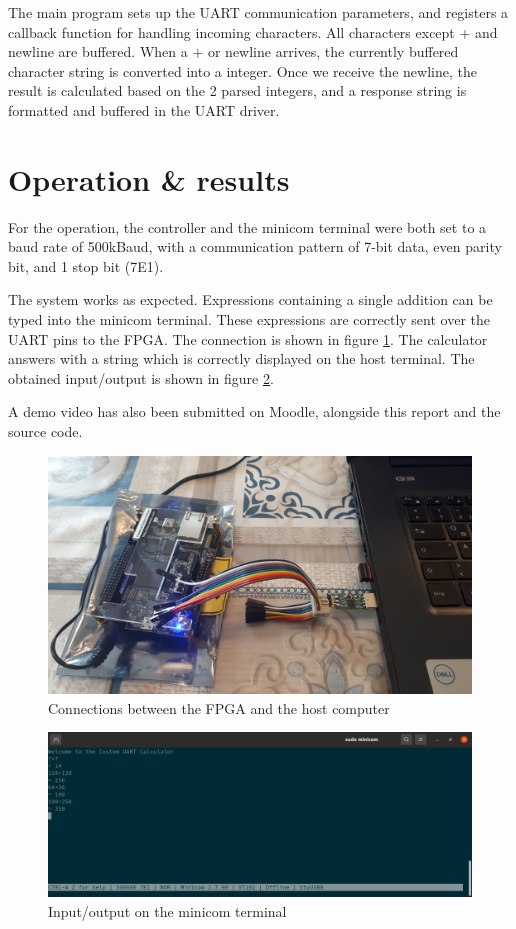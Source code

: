 \documentclass[12pt,a4paper]{article}
\begin{document}
The main program sets up the UART communication parameters, and registers a callback function for handling incoming characters. All characters except + and newline are buffered. When a + or newline arrives, the currently buffered character string is converted into a integer. Once we receive the newline, the result is calculated based on the 2 parsed integers, and a response string is formatted and buffered in the UART driver.


\section{Operation \& results}

For the operation, the controller and the minicom terminal were both set to a baud rate of 500kBaud, with a communication pattern of 7-bit data, even parity bit, and 1 stop bit (7E1).

The system works as expected. Expressions containing a single addition can be typed into the minicom terminal. These expressions are correctly sent over the UART pins to the FPGA. The connection is shown in figure \ref{fig:connection}. The calculator answers with a string which is correctly displayed on the host terminal. The obtained input/output is shown in figure \ref{fig:io}.

A demo video has also been submitted on Moodle, alongside this report and the source code.

\begin{figure}[p]
	\centering
	\includegraphics[width=\textwidth]{connections}
	\caption{Connections between the FPGA and the host computer}
	\label{fig:connection}
\end{figure}

\begin{figure}[p]
	\centering
	\includegraphics[width=\textwidth]{io_crop}
	\caption{Input/output on the minicom terminal}
	\label{fig:io}
\end{figure}
\end{document}
